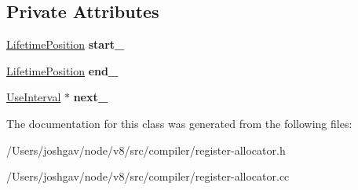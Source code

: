 \subsection*{Private Attributes}
\begin{DoxyCompactItemize}
\item 
\hyperlink{classv8_1_1internal_1_1compiler_1_1_lifetime_position}{Lifetime\+Position} {\bfseries start\+\_\+}\hypertarget{classv8_1_1internal_1_1compiler_1_1_use_interval_a5b50e95431d5ab18280706810339e828}{}\label{classv8_1_1internal_1_1compiler_1_1_use_interval_a5b50e95431d5ab18280706810339e828}

\item 
\hyperlink{classv8_1_1internal_1_1compiler_1_1_lifetime_position}{Lifetime\+Position} {\bfseries end\+\_\+}\hypertarget{classv8_1_1internal_1_1compiler_1_1_use_interval_a681a1bb0eaa96757b950c5e4834fdfa8}{}\label{classv8_1_1internal_1_1compiler_1_1_use_interval_a681a1bb0eaa96757b950c5e4834fdfa8}

\item 
\hyperlink{classv8_1_1internal_1_1compiler_1_1_use_interval}{Use\+Interval} $\ast$ {\bfseries next\+\_\+}\hypertarget{classv8_1_1internal_1_1compiler_1_1_use_interval_a1b12fe0a8936b749c20032f24a1f4c62}{}\label{classv8_1_1internal_1_1compiler_1_1_use_interval_a1b12fe0a8936b749c20032f24a1f4c62}

\end{DoxyCompactItemize}


The documentation for this class was generated from the following files\+:\begin{DoxyCompactItemize}
\item 
/\+Users/joshgav/node/v8/src/compiler/register-\/allocator.\+h\item 
/\+Users/joshgav/node/v8/src/compiler/register-\/allocator.\+cc\end{DoxyCompactItemize}
